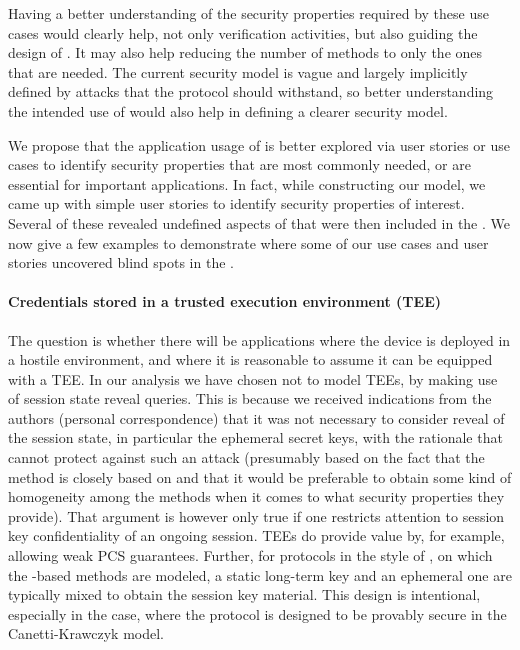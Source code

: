 \documentclass[runningheads,draft,x11names]{llncs}
\begin{document}
Having a better understanding of the security properties required by these use
cases would clearly help, not only verification activities, but also  guiding
the design of \mEdhoc{}.
%
It may also help reducing the number of methods to only the ones that are needed.
%
The current security model is vague and largely implicitly defined by attacks
that the protocol should withstand, so better understanding the intended use of
\mEdhoc{} would also help in defining a clearer security model.
%

We propose that the application usage of \mEdhoc{} is better explored
via user stories or use cases to identify security properties that are most
commonly needed, or are essential for important applications.
%
In fact, while constructing our model, we came up with simple user stories to
identify security properties of interest.
%
Several of these revealed undefined aspects of \mEdhoc{} that were then included
in the \mSpec.
%
We now give a few examples to demonstrate where some of our use cases and user
stories uncovered blind spots in the \mSpec.
%

\paragraph{Credentials stored in a trusted execution environment (TEE)}
The question is whether there will be applications where the device is
deployed in a hostile environment, and where it is reasonable to assume it can
be equipped with a TEE.
%
In our analysis we have chosen not to model TEEs, by making use of session
state reveal queries.
%
This is because we received indications from the \mSpec{} authors (personal
correspondence) that it was not
necessary to consider reveal of the session state, in particular the ephemeral
secret keys, with the rationale that \mSigma{} cannot protect against such an
attack (presumably based on the fact that the \mSigSig{} method is closely based on
\mSigmaI{} and that it would be preferable to obtain some kind of homogeneity
among the \mEdhoc{} methods when it comes to what security properties they
provide).
%
That argument is however only true if one restricts attention to session key
confidentiality of an ongoing session.
%
TEEs do provide value by, for example, allowing weak PCS guarantees.
%
Further, for protocols in the style of \mOptls{}, on which the \mStat{}-based
methods are modeled, a static long-term
key and an ephemeral one are typically mixed to obtain the session key material.
%
This design is intentional, especially in the \mOptls{} case, where the protocol
is designed to be provably secure in the Canetti-Krawczyk model.
%
\end{document}
